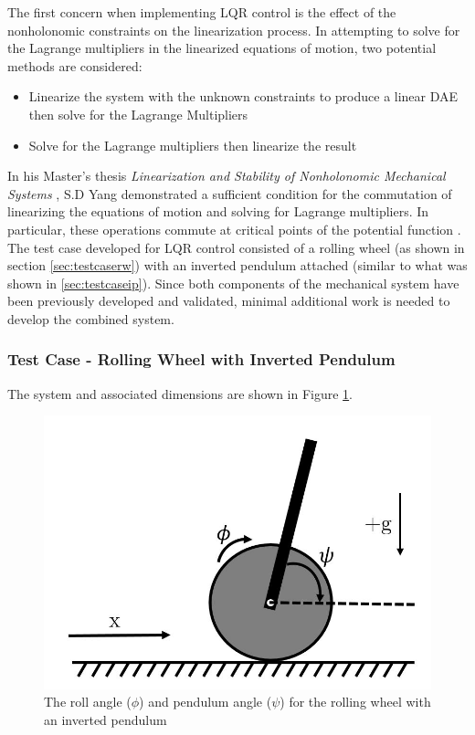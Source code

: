 The first concern when implementing LQR control is the effect of the nonholonomic constraints on the linearization process. 
In attempting to solve for the Lagrange multipliers in the linearized equations of motion, two potential methods are considered:
\begin{itemize}
	\item Linearize the system with the unknown constraints to produce a linear DAE then solve for the Lagrange Multipliers
	\item Solve for the Lagrange multipliers then linearize the result
\end{itemize}
In his Master's thesis \textit{Linearization and Stability of Nonholonomic Mechanical Systems} \cite{LinNonHolo}, S.D Yang demonstrated a sufficient condition for the commutation of linearizing the equations of motion and solving for Lagrange multipliers. 
In particular, these operations commute at critical points of the potential function \cite{LinNonHolo}.
The test case developed for LQR control consisted of a rolling wheel (as shown in section \ref{sec:testcaserw}) with an inverted pendulum attached (similar to what was shown in \ref{sec:testcaseip}). 
Since both components of the mechanical system have been previously developed and validated, minimal additional work is needed to develop the combined system. 

\subsubsection{Test Case - Rolling Wheel with Inverted Pendulum}

The system and associated dimensions are shown in Figure \ref{fig:invert}.

\begin{figure}[!htb]
	\centering
	\includegraphics[width=\linewidth]{rollingwheelinvertedpendulum.JPG}
	\caption{The roll angle ($\phi$) and pendulum angle ($\psi$) for the rolling wheel with an inverted pendulum}\label{fig:invert}
	\endminipage
\end{figure}

